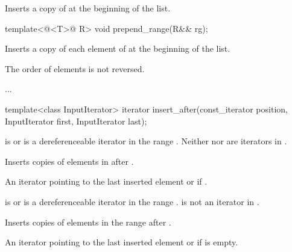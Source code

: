 \documentclass{wg21}
\begin{document}
\begin{itemdescr}
    \pnum
    \effects
    Inserts a copy of  at the beginning of the list.
\end{itemdescr}

\begin{addedblock}
\begin{itemdecl}
template<@<T>@ R>
void prepend_range(R&& rg);
\end{itemdecl}

\begin{itemdescr}
\pnum
\effects
Inserts a copy of each element of  at the beginning of the list. \begin{note}
The order of elements is not reversed.
\end{note}
\end{itemdescr}
\end{addedblock}

...

\begin{itemdecl}
    template<class InputIterator>
    iterator insert_after(const_iterator position, InputIterator first, InputIterator last);
\end{itemdecl}

\begin{itemdescr}
    \pnum
    \expects
     is  or is a dereferenceable
    iterator in the range .
    Neither  nor  are iterators in .

    \pnum
    \effects
    Inserts copies of elements in  after .

    \pnum
    \returns
    An iterator pointing to the last inserted element or  if .
\end{itemdescr}

\begin{addedblock}
\begin{itemdecl}
template<@<T>@ R>}
iterator insert_range_after(const_iterator position, R&& rg);}
\end{itemdecl}

\begin{itemdescr}
    \pnum
    \expects
     is  or is a dereferenceable
    iterator in the range .
     is not an iterator in .

    \pnum
    \effects
    Inserts copies of elements in the range  after .

    \pnum
    \returns
    An iterator pointing to the last inserted element or  if  is empty.
\end{itemdescr}
\end{addedblock}
\end{document}
